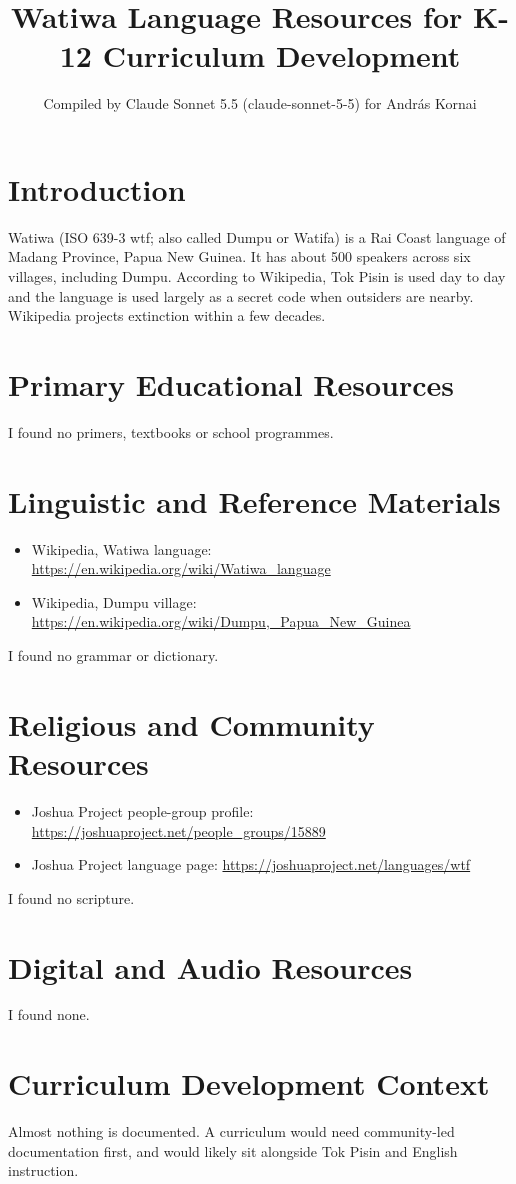 \documentclass[12pt]{article}
\title{Watiwa Language Resources for K-12 Curriculum Development}
\author{Compiled by Claude Sonnet 5.5 (claude-sonnet-5-5) for Andr\'as Kornai}
\date{}
\begin{document}
\maketitle

\section{Introduction}
Watiwa (ISO 639-3 wtf; also called Dumpu or Watifa) is a Rai Coast language of Madang Province, Papua New Guinea. It has about 500 speakers across six villages, including Dumpu. According to Wikipedia, Tok Pisin is used day to day and the language is used largely as a secret code when outsiders are nearby. Wikipedia projects extinction within a few decades.

\section{Primary Educational Resources}
I found no primers, textbooks or school programmes.

\section{Linguistic and Reference Materials}
\begin{itemize}
\item Wikipedia, Watiwa language: \url{https://en.wikipedia.org/wiki/Watiwa_language}
\item Wikipedia, Dumpu village: \url{https://en.wikipedia.org/wiki/Dumpu,_Papua_New_Guinea}
\end{itemize}
I found no grammar or dictionary.

\section{Religious and Community Resources}
\begin{itemize}
\item Joshua Project people-group profile: \url{https://joshuaproject.net/people_groups/15889}
\item Joshua Project language page: \url{https://joshuaproject.net/languages/wtf}
\end{itemize}
I found no scripture.

\section{Digital and Audio Resources}
I found none.

\section{Curriculum Development Context}
Almost nothing is documented. A curriculum would need community-led documentation first, and would likely sit alongside Tok Pisin and English instruction.
\end{document}
